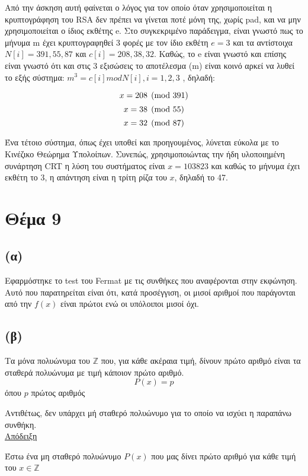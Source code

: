 \documentclass[a4paper, 11pt]{article}
\newcommand{\lt}{\latintext}
\begin{document}
Από την άσκηση αυτή φαίνεται ο λόγος για τον οποίο όταν χρησιμοποιείται η κρυπτογράφηση του {\lt RSA} δεν πρέπει να γίνεται ποτέ μόνη της, χωρίς {\lt pad}, και να μην χρησιμοποιείται ο ίδιος εκθέτης {\lt e}. Στο συγκεκριμένο παράδειγμα, είναι γνωστό πως το μήνυμα {\lt m} έχει κρυπτογραφηθεί 3 φορές με τον ίδιο εκθέτη $ e = 3 $ και τα αντίστοιχα $ N[i] = 391, 55, 87 $ και $ c[i] = 208, 38, 32 $. Καθώς, το {\lt e} είναι γνωστό και επίσης είναι γνωστό ότι και στις 3 εξισώσεις το αποτέλεσμα ({\lt m}) είναι κοινό αρκεί να λυθεί το εξής σύστημα: $ m^3 = c[i] mod N[i] , i = 1,2,3 $ , δηλαδή:

\[ x = 208 \pmod{391} \\ \]
\[ x = 38 \pmod{55}  \\ \]
\[ x = 32 \pmod{87}  \\ \]

Ένα τέτοιο σύστημα, όπως έχει υποθεί και προηγουμένος, λύνεται εύκολα με το Κινέζικο Θεώρημα Υπολοίπων. Συνεπώς, χρησιμοποιώντας την ήδη υλοποιημένη συνάρτηση {\lt CRT} η λύση του συστήματος είναι $ x = 103823 $ και καθώς το μήνυμα έχει εκθέτη το 3, η απάντηση είναι η τρίτη ρίζα του $x$, δηλαδή το 47.


\newpage


\section*{Θέμα 9}
\subsection*{(α)} Εφαρμόστηκε το test του {\lt Fermat} με τις συνθήκες που αναφέρονται στην εκφώνηση. Αυτό που παρατηρείται είναι ότι, κατά προσέγγιση, οι μισοί αριθμοί που παράγονται από την $f(x)$ είναι πρώτοι ενώ οι υπόλοιποι μισοί όχι.
\subsection*{(β)} Τα μόνα πολυώνυμα του $\mathbb{Z}$ που, για κάθε ακέραια τιμή, δίνουν πρώτο αριθμό είναι τα σταθερά πολυώνυμα με τιμή κάποιον πρώτο αριθμό.
\[P(x) = p\] όπου {\lt $p$} πρώτος αριθμός

Αντιθέτως, δεν υπάρχει μή σταθερό πολυώνυμο για το οποίο να ισχύει η παραπάνω συνθήκη.\\

\underline{Απόδειξη}

Έστω ένα μη σταθερό πολυώνυμο $P(x)$ που μας δίνει πρώτο αριθμό για κάθε τιμή του $x \in \mathbb{Z}$
\end{document}

